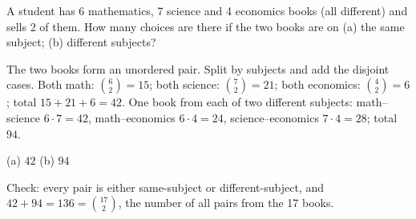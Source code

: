 
\begin{problem}
	A student has 6 mathematics, 7 science and 4 economics books (all
	different) and sells 2 of them. How many choices are there if the two books
	are on (a) the same subject; (b) different subjects?
\end{problem}

\begin{solution}
	\idea The two books form an unordered pair. Split by subjects and add the
	disjoint cases.
	 Both math: $\binom62=15$; both science: $\binom72=21$; both
	economics: $\binom42=6$; total $15+21+6=42$.
	 One book from each of two different subjects:
	math--science $6\cdot7=42$, math--economics $6\cdot4=24$,
	science--economics $7\cdot4=28$; total $94$.
	\begin{answer}
		(a) $42$ \qquad (b) $94$
	\end{answer}
	\begin{remark}
		Check: every pair is either same-subject or different-subject, and
		$42+94=136=\binom{17}{2}$, the number of all pairs from the 17 books.
	\end{remark}
\end{solution}
